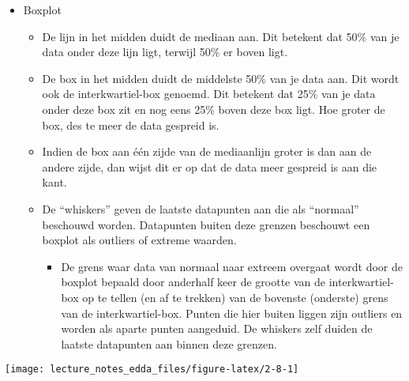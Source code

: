 \documentclass[]{memoir}
\providecommand{\tightlist}{%
  \setlength{\itemsep}{0pt}\setlength{\parskip}{0pt}}
\begin{document}
\begin{itemize}
\tightlist
\item
  Boxplot

  \begin{itemize}
  \tightlist
  \item
    De lijn in het midden duidt de mediaan aan. Dit betekent dat 50\%
    van je data onder deze lijn ligt, terwijl 50\% er boven ligt.
  \item
    De box in het midden duidt de middelste 50\% van je data aan. Dit
    wordt ook de interkwartiel-box genoemd. Dit betekent dat 25\% van je
    data onder deze box zit en nog eens 25\% boven deze box ligt. Hoe
    groter de box, des te meer de data gespreid is.
  \item
    Indien de box aan één zijde van de mediaanlijn groter is dan aan de
    andere zijde, dan wijst dit er op dat de data meer gespreid is aan
    die kant.
  \item
    De ``whiskers'' geven de laatste datapunten aan die als ``normaal''
    beschouwd worden. Datapunten buiten deze grenzen beschouwt een
    boxplot als outliers of extreme waarden.

    \begin{itemize}
    \tightlist
    \item
      De grens waar data van normaal naar extreem overgaat wordt door de
      boxplot bepaald door anderhalf keer de grootte van de
      interkwartiel-box op te tellen (en af te trekken) van de bovenste
      (onderste) grens van de interkwartiel-box. Punten die hier buiten
      liggen zijn outliers en worden als aparte punten aangeduid. De
      whiskers zelf duiden de laatste datapunten aan binnen deze
      grenzen.
    \end{itemize}
  \end{itemize}
\end{itemize}

\texttt{[image: lecture\_notes\_edda\_files/figure-latex/2-8-1]}
\end{document}
